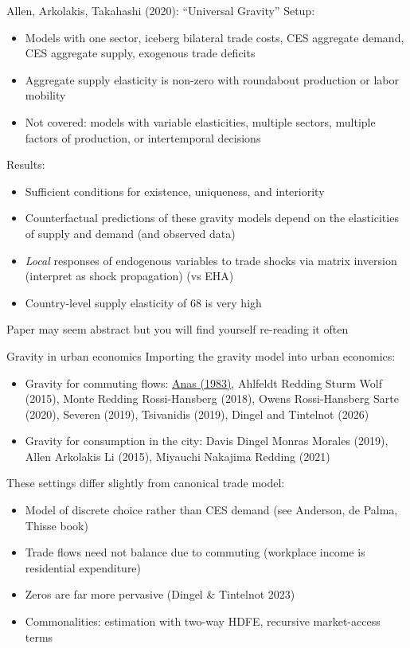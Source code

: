 \documentclass[10pt,notes=hide,aspectratio=169]{beamer}
\begin{document}
\begin{frame}{Allen, Arkolakis, Takahashi (2020): ``Universal Gravity''}
Setup:
\begin{itemize}
\item Models with one sector, iceberg bilateral trade costs, CES aggregate demand, CES aggregate supply, exogenous trade deficits
\item Aggregate supply elasticity is non-zero with roundabout production or labor mobility
\item Not covered: models with variable elasticities, multiple sectors, multiple factors of production, or intertemporal decisions
\end{itemize}
Results:
\begin{itemize}
\item Sufficient conditions for existence, uniqueness, and interiority
\item Counterfactual predictions of these gravity models depend on the elasticities of supply and demand (and observed data)
\item \textit{Local} responses of endogenous variables to trade shocks via matrix inversion
(interpret as shock propagation)
(vs EHA)
\item Country-level supply elasticity of 68 is very high
\end{itemize}
Paper may seem abstract but you will find yourself re-reading it often
\end{frame}
\begin{frame}{Gravity in urban economics}
Importing the gravity model into urban economics:
\begin{itemize}
	\item Gravity for commuting flows: 
	\href{https://doi.org/10.1016/0191-2615(83)90023-1}{Anas (1983)},
	Ahlfeldt Redding Sturm Wolf (2015), Monte Redding Rossi-Hansberg (2018), Owens Rossi-Hansberg Sarte (2020), Severen (2019), Tsivanidis (2019), Dingel and Tintelnot (2026)
	\item Gravity for consumption in the city:
	Davis Dingel Monras Morales (2019), Allen Arkolakis Li (2015), Miyauchi Nakajima Redding (2021)
\end{itemize}
These settings differ slightly from canonical trade model: 
\begin{itemize}
	\item Model of discrete choice rather than CES demand (see Anderson, de Palma, Thisse book)
	\item Trade flows need not balance due to commuting (workplace income is residential expenditure)
	\item Zeros are far more pervasive (Dingel \& Tintelnot 2023)
	\item Commonalities: estimation with two-way HDFE, recursive market-access terms
\end{itemize}
\end{frame}
\end{document}
